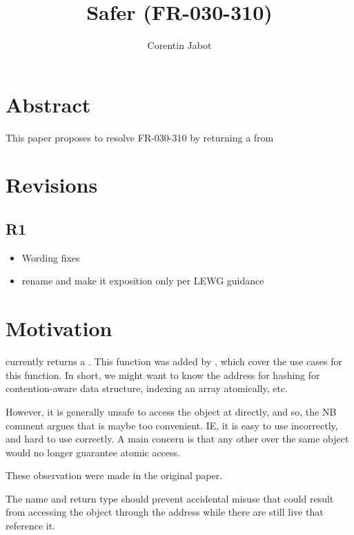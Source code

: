 \documentclass{wg21}
\title{Safer \tcode{atomic\_ref::address} (FR-030-310)}
\author{Corentin Jabot}{corentin.jabot@gmail.com}
\begin{document}
\maketitle

\section{Abstract}

This paper proposes to resolve FR-030-310 by returning a  from 


\section{Revisions}

\subsection{R1}

\begin{itemize}
    \item Wording fixes
    \item rename  and make it exposition only per LEWG guidance
\end{itemize}

\section{Motivation}

 currently returns a . This function was added by ,
which cover the use cases for this function.
In short, we might want to know the address for hashing for contention-aware data structure, indexing an array atomically, etc.

However, it is generally unsafe to access the object at  directly, and so, the NB comment argues that  is maybe too convenient.
IE, it is easy to use incorrectly, and hard to use correctly.
A main concern is that any other  over the same object would no longer guarantee atomic access.

These observation were made in the original paper.

\begin{quoteblock}
The name and return type should prevent accidental misuse that could result from accessing the object through the address while there are still live  that reference it.
\end{quoteblock}
\end{document}
